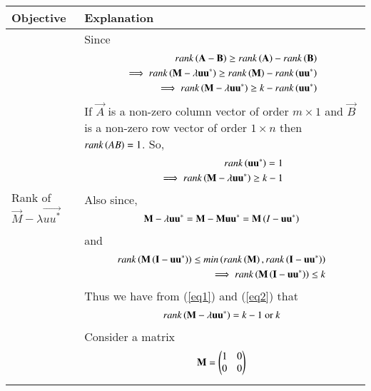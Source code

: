 \documentclass[journal,12pt,twocolumn]{IEEEtran}
\begin{document}
\begin{table}[htbp]
        \centering
	\begin{tabular}{|m{2.0in}|m{5.0in}|} \hline
		\textbf{Objective} & \textbf{Explanation} \\ \hline
	Rank of $\vec{M}-\lambda \vec{uu^*}$ & Since 
	\begin{align}
	rank\left(\mathbf{A}-\mathbf{B}\right) \geq rank\left(\mathbf{A}\right)-rank\left(\mathbf{B}\right) \\
		\implies rank\left(\mathbf{M}-\lambda\mathbf{uu^*}\right) \geq 
	rank\left(\mathbf{M}\right)-rank\left(\mathbf{uu^*}\right) \\
		\implies rank\left(\mathbf{M}-\lambda\mathbf{uu^*}\right) \geq k-rank\left(\mathbf{uu^*}\right)
	\end{align} 
If $\vec{A}$ is a non-zero column vector of order $m\times 1$ and $\vec{B}$ is a non-zero row vector 
of order $1\times n$ then $rank\left(AB\right)=1$. So,
	\begin{align}
	rank\brak{\vec{uu^*}}=1 \\
	\implies rank\brak{\vec{M}-\lambda\vec{uu^*}} \geq k-1 \label{eq1}
	\end{align}
Also since,
	\begin{align}
	\mathbf{M}-\lambda\mathbf{uu^*} = \mathbf{M}-\mathbf{Muu^*}=\mathbf{M}\left(I-\mathbf{uu^*}\right)
	\end{align}
and
	\begin{align}
	rank\brak{\vec{M}\brak{\vec{I}-\vec{uu^*}}}
	\leq min\brak{rank\brak{\vec{M}},rank\brak{\vec{I}-\vec{uu^*}}} \\
	\implies
	rank\brak{\vec{M}\brak{\vec{I}-\vec{uu^*}}} \leq k \label{eq2}
	\end{align}
Thus we have from (\ref{eq1}) and (\ref{eq2}) that
	\begin{align}
	rank\left(\mathbf{M}-\lambda\mathbf{uu^*}\right) = k-1 \ \text{or} \ k
	\end{align}
	Consider a matrix 
	\begin{align}
		\mathbf{M}=\begin{pmatrix}1&0\\0&0\end{pmatrix}
	\end{align}
\end{tabular}
\end{table}
\end{document}

